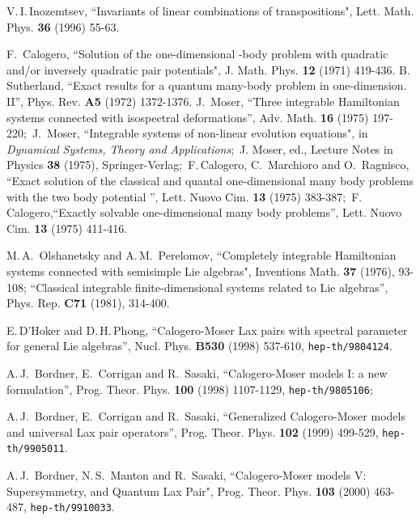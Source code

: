 \documentclass[a4paper,12pt]{article}
\begin{document}
\begin{thebibliography}{99}
V.\,I.\,Inozemtsev, ``Invariants of linear combinations of transpositions",
Lett. Math. Phys. {\bf 36} (1996) 55-63.

  F.\, Calogero, ``Solution of the one-dimensional
\coordHE{}-body problem with quadratic and/or inversely quadratic pair
potentials", J. Math. Phys. {\bf 12} (1971) 419-436.
B.\, Sutherland, ``Exact results for a quantum many-body problem in
one-dimension. II'', Phys. Rev. {\bf A5} (1972) 1372-1376.
J.\, Moser, ``Three integrable Hamiltonian systems connected with
isospectral deformations'',  Adv. Math. {\bf 16} (1975) 197-220;\
J.\, Moser,  ``Integrable systems of non-linear evolution equations",
in {\it Dynamical Systems, Theory and Applications\/};\
J. Moser, ed., Lecture Notes in Physics {\bf 38} (1975),
Springer-Verlag;\
F.\,Calogero, C.\, Marchioro and O.\, Ragnisco, ``Exact solution of the
classical and quantal one-dimensional many body problems with
the two body potential \coordHE{}'', Lett. Nuovo
Cim. {\bf 13} (1975) 383-387;\
F.\,Calogero,``Exactly solvable one-dimensional many body problems'',
Lett. Nuovo Cim. {\bf 13} (1975) 411-416.


\bibitem{OP1} M.\,A.\, Olshanetsky and A.\,M.\, Perelomov,
``Completely integrable Hamiltonian systems connected with
 semisimple Lie algebras",
 Inventions Math. {\bf 37} (1976), 93-108;
 ``Classical integrable finite-dimensional systems related to Lie
 algebras'',
 Phys. Rep.  {\bf C71} (1981), 314-400.

 \bibitem{DHoker_Phong}
E.\,D'Hoker and D.\,H.\,Phong, ``Calogero-Moser
Lax pairs with spectral parameter for general Lie algebras'',
Nucl. Phys. {\bf B530} (1998) 537-610, {\tt hep-th/9804124}.




 A.\,J.\, Bordner, E.\, Corrigan and R.\, Sasaki,
``Calogero-Moser models I: a new formulation'',
Prog. Theor. Phys. {\bf 100} (1998) 1107-1129, {\tt hep-th/9805106};


 \bibitem{bcs2}  A.\,J.\, Bordner, E.\, Corrigan and R.\, Sasaki,
``Generalized Calogero-Moser models and  universal Lax pair operators'',
 Prog. Theor. Phys. {\bf 102}  (1999)  499-529,
 {\tt  hep-th/9905011}.



  A.\,J.\, Bordner, N.\,S.\, Manton and R.\, Sasaki,
``Calogero-Moser models V:  Supersymmetry,
and Quantum Lax Pair", Prog. Theor. Phys. {\bf 103} (2000) 463-487,
{\tt hep-th/9910033}.



\end{thebibliography}
\end{document}
